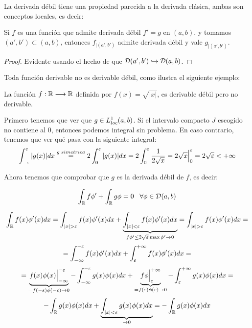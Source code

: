 La derivada débil tiene una propiedad parecida a la derivada clásica, ambas son conceptos locales, es decir:

\begin{prop}
Si $f$ es una función que admite derivada débil $f'=g$ en $(a,b)$, y tomamos $(a',b')\subset(a,b)$, entonces $f_{|(a',b')}$ admite derivada débil y vale $g_{|(a',b')}$.
\end{prop}

\begin{proof}
Evidente usando el hecho de que $\mathcal{D}(a',b')\hookrightarrow\mathcal{D}(a,b)$.
\end{proof}

Toda función derivable no es derivable débil, como ilustra el siguiente ejemplo:

\begin{example}
La función $f : \mathbb{R} \longrightarrow \mathbb{R}$ definida por $f(x)=\sqrt{|x|}$, es derivable débil pero no derivable.

Primero tenemos que ver que $g\in L^1_{loc}(a,b)$. Si el intervalo compacto $J$ escogido no contiene al 0, entonces podemos integral sin problema. En caso contrario, tenemos que ver qué pasa con la siguiente integral:
\[
\displaystyle\int_{ -\varepsilon }^{ \varepsilon } |g(x)|dx\overset{g\; simetrica}{=}2\displaystyle\int_{ 0 }^{ \varepsilon } |g(x)|dx=2\displaystyle\int_{ 0 }^{ \varepsilon } \frac{1}{2\sqrt{x}}=2\sqrt{x}\Big|_0^\varepsilon=2\sqrt{\varepsilon}<+\infty
\]

Ahora tenemos que comprobar que $g$ es la derivada débil de $f$, es decir:

\[
\displaystyle\int_{ \mathbb{R} }^{  } f\phi'+\displaystyle\int_{ \mathbb{R} }^{  } g\phi=0 \;\;\; \forall\phi\in\mathcal{D}(a,b)
\]

\[
\integral{\R}{}{f(x)\phi'(x)dx}=\integral{|x|>\varepsilon}{}{f(x)\phi'(x)dx}+\underbrace{\integral{|x|<\varepsilon}{}{f(x)\phi'(x)dx}}_{f\phi'\leq2\sqrt{\varepsilon}\max\phi'\to0}=\integral{|x|>\varepsilon}{}{f(x)\phi'(x)dx}=
\]
\[
=\displaystyle\int_{ -\infty }^{ -\varepsilon } f(x)\phi'(x)dx+\displaystyle\int_{ \varepsilon }^{ +\infty } f(x)\phi'(x)dx=
\]
\[
=\underbrace{f(x)\phi(x)\Big|_{-\infty}^{-\varepsilon}}_{=f(-\varepsilon)\phi(-\varepsilon)\to 0}-
\displaystyle\int_{ -\infty }^{ -\varepsilon } g(x)\phi(x) dx+
\underbrace{f\phi\Big|_{\varepsilon}^{+\infty}}_{{=f(\varepsilon)\phi(\varepsilon)\to 0}}-
\displaystyle\int_{ \varepsilon }^{ +\infty } g(x)\phi(x) dx=
\]
\[
-\displaystyle\int_{ \mathbb{R} }^{  } g(x)\phi(x)dx+\underbrace{\displaystyle\int_{ |x|<\varepsilon }^{  } g(x)\phi(x)dx}_{\to0}=-\displaystyle\int_{ \mathbb{R} }^{  } g(x)\phi(x)dx
\]

\end{example}

